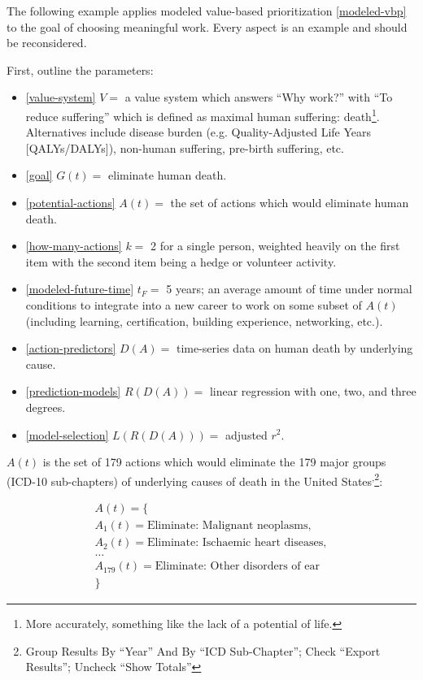 \documentclass[12pt, a4paper, twocolumn]{article}
\begin{document}
The following example applies modeled value-based prioritization \eqref{modeled-vbp} to the goal of choosing meaningful work. Every aspect is an example and should be reconsidered.

First, outline the parameters:

\begin{itemize}
\item \eqref{value-system} $V = $ a value system which answers \enquote{Why work?} with \enquote{To reduce suffering} which is defined as maximal human suffering: death\footnote{More accurately, something like the lack of a potential of life.}. Alternatives include disease burden (e.g. Quality-Adjusted Life Years [QALYs/DALYs]\cite{weinstein2009qalys}), non-human suffering, pre-birth suffering, etc.
\item \eqref{goal} $G(t) = $ eliminate human death.
\item \eqref{potential-actions} $A(t) = $ the set of actions which would eliminate human death.
\item \eqref{how-many-actions} $k = $ 2 for a single person, weighted heavily on the first item with the second item being a hedge or volunteer activity.
\item \eqref{modeled-future-time} $t_F = $ 5 years; an average amount of time under normal conditions to integrate into a new career to work on some subset of $A(t)$ (including learning, certification, building experience, networking, etc.).
\item \eqref{action-predictors} $D(A) = $ time-series data on human death by underlying cause.
\item \eqref{prediction-models} $R(D(A)) = $ linear regression with one, two, and three degrees.
\item \eqref{model-selection} $L(R(D(A))) = $ adjusted $r^2$.
\end{itemize}

$A(t)$ is the set of 179 actions which would eliminate the 179 major groups (ICD-10 sub-chapters\cite{icd10}) of underlying causes of death in the United States\cite{centers2017underlying}\textsuperscript{,}\footnote{Group Results By \enquote{Year} And By \enquote{ICD Sub-Chapter}; Check \enquote{Export Results}; Uncheck \enquote{Show Totals}}:

\begin{equation*}
\begin{gathered}
A(t) = \{\\
A_1(t) = \textrm{Eliminate: Malignant neoplasms},\\
A_2(t) = \textrm{Eliminate: Ischaemic heart diseases},\\
\textrm{\ldots}\\
A_{179}(t) = \textrm{Eliminate: Other disorders of ear}\\
\}
\end{gathered}
\end{equation*}
\end{document}
